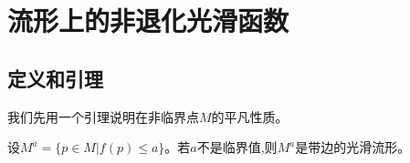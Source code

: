 \ifx\allfiles\undefined

	
	
\else
\fi
\chapter{流形上的非退化光滑函数}
\section{定义和引理}
我们先用一个引理说明在非临界点$M$的平凡性质。
\begin{lemma}[非临界点]
	设$M^a=\{p\in M|f(p)\leq a\}$。若$a$不是临界值,则$M^a$是带边的光滑流形。
\end{lemma}
\ifx\allfiles\undefined
	
	
	
	
	\else
	\fi